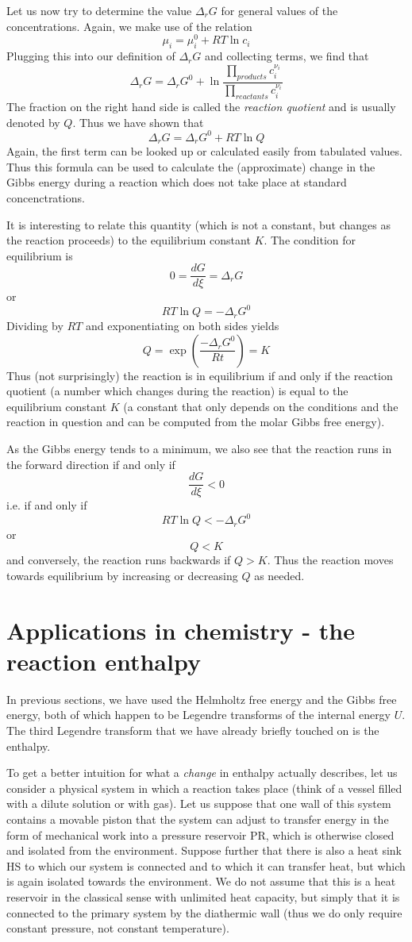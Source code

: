 \documentclass[a4paper, draft]{article}
\theoremstyle{own}
\theoremstyle{remark}
\begin{document}
Let us now try to determine the value $\Delta_r G$ for general values of the concentrations. Again, we make use of the relation
$$
\mu_i = \mu_i^0 + RT \ln c_i
$$
Plugging this into our definition of $\Delta_r G$ and collecting terms, we find that
$$
\Delta_r G = \Delta_r G^0 + \ln \frac{\prod_{products} c_i^{\nu_i}}{\prod_{reactants} c_i^{\nu_i}}
$$
The fraction on the right hand side is called the {\em reaction quotient} and is usually denoted by $Q$. Thus we have shown that
$$
\Delta_r G = \Delta_r G^0 + RT \ln Q
$$
Again, the first term can be looked up or calculated easily from tabulated values. Thus this formula can be used to calculate the (approximate) change in the Gibbs energy during a reaction which does not take place at standard concenctrations.

It is interesting to relate this quantity (which is not a constant, but changes as the reaction proceeds) to the equilibrium constant $K$. The condition for equilibrium is
$$
0 = \frac{dG}{d\xi} = \Delta_r G 
$$
or
$$
RT \ln Q = - \Delta_r G^0 
$$
Dividing by $RT$ and exponentiating on both sides yields
$$
Q = \exp(\frac{- \Delta_r G^0}{Rt}) = K
$$
Thus (not surprisingly) the reaction is in equilibrium if and only if the reaction quotient (a number which changes during the reaction) is equal to the equilibrium constant $K$ (a constant that only depends on the conditions and the reaction in question and can be computed from the molar Gibbs free energy).	

As the Gibbs energy tends to a minimum, we also see that the reaction runs in the forward direction if and only if
$$
\frac{dG}{d\xi} < 0
$$
i.e. if and only if
$$
RT \ln Q < - \Delta_r G^0 
$$
or
$$
Q < K
$$ 
and conversely, the reaction runs backwards if $Q > K$. Thus the reaction moves towards equilibrium by increasing or decreasing $Q$ as needed. 
	
\section{Applications in chemistry - the reaction enthalpy}

In previous sections, we have used the Helmholtz free energy and the Gibbs free energy, both of which happen to be Legendre transforms of the internal energy $U$. The third Legendre transform that we have already briefly touched on is the enthalpy.

To get a better intuition for what a {\em change} in enthalpy actually describes, let us consider a physical system in which a reaction takes place (think of a vessel filled with a dilute solution or with gas). Let us suppose that one wall of this system contains a movable piston that the system can adjust to transfer energy in the form of mechanical work into a pressure reservoir PR, which is otherwise closed and isolated from the environment. Suppose further that there is also a heat sink HS to which our system is connected and to which it can transfer heat, but which is again isolated towards the environment. We do not assume that this is a heat reservoir in the classical sense with unlimited heat capacity, but simply that it is connected to the primary system by the diathermic wall (thus we do only require constant pressure, not constant temperature).
\end{document}
